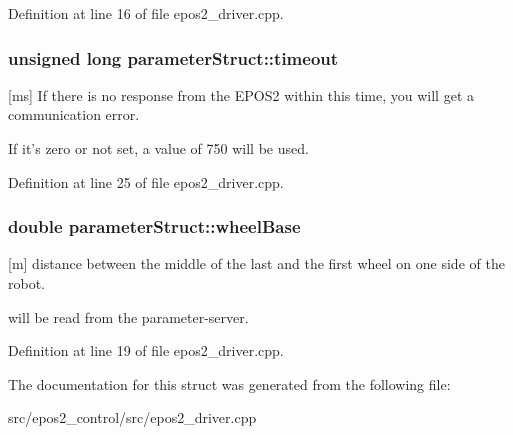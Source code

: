 Definition at line 16 of file epos2\-\_\-driver.\-cpp.

\hypertarget{structparameterStruct_afa1a24b4f578f635e115c817a5bc4c38}{
\subsubsection[{timeout}]{\setlength{\rightskip}{0pt plus 5cm}unsigned long parameter\-Struct\-::timeout}}\label{structparameterStruct_afa1a24b4f578f635e115c817a5bc4c38}


\mbox{[}ms\mbox{]} If there is no response from the E\-P\-O\-S2 within this time, you will get a communication error. 

If it's zero or not set, a value of 750 will be used. 

Definition at line 25 of file epos2\-\_\-driver.\-cpp.

\hypertarget{structparameterStruct_acf8bcc9f3ae045e1618bf779f151305f}{
\subsubsection[{wheel\-Base}]{\setlength{\rightskip}{0pt plus 5cm}double parameter\-Struct\-::wheel\-Base}}\label{structparameterStruct_acf8bcc9f3ae045e1618bf779f151305f}


\mbox{[}m\mbox{]} distance between the middle of the last and the first wheel on one side of the robot. 

will be read from the parameter-\/server. 

Definition at line 19 of file epos2\-\_\-driver.\-cpp.



The documentation for this struct was generated from the following file\-:\begin{DoxyCompactItemize}
\item 
src/epos2\-\_\-control/src/epos2\-\_\-driver.\-cpp\end{DoxyCompactItemize}
